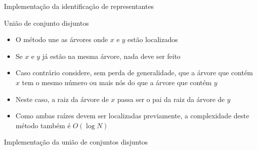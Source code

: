\begin{frame}[fragile]{Implementação da identificação de representantes}
\end{frame}

\begin{frame}[fragile]{União de conjunto disjuntos}

    \begin{itemize}
        \item O método  une as árvores onde $x$ e $y$ estão localizados

        \item Se $x$ e $y$ já estão na mesma árvore, nada deve ser feito

        \item Caso contrário considere, sem perda de generalidade, que a árvore que contém $x$ tem 
            o mesmo número ou mais nós do que a árvore que contém $y$

        \item Neste caso, a raiz da árvore de $x$ passa ser o pai da raiz da árvore de $y$

        \item Como ambas raízes devem ser localizadas previamente, a complexidade deste método
            também é $O(\log N)$
            
    \end{itemize}

\end{frame}



\begin{frame}[fragile]{Implementação da união de conjuntos disjuntos}
\end{frame}
